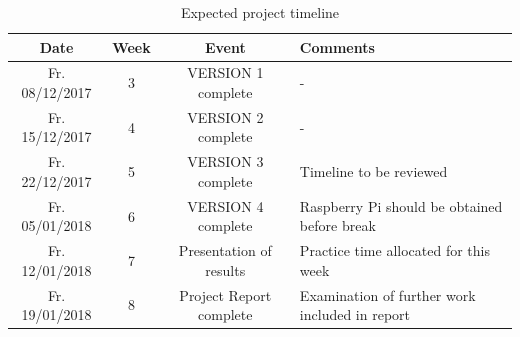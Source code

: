 \documentclass[11pt]{article}
\begin{document}
\begin{table}[!h] \label{timeline} \centering
 \begin{tabular}{|c c c p{5.5cm}|} 
 \hline
 Date & Week & Event & Comments \\ [0.5ex] 
 \hline
 Fr. 08/12/2017 & 3 & VERSION 1 complete & - \\
 Fr. 15/12/2017 & 4 & VERSION 2 complete & - \\
 Fr. 22/12/2017 & 5 & VERSION 3 complete & Timeline to be reviewed \\
 Fr. 05/01/2018 & 6 & VERSION 4 complete & Raspberry Pi should be obtained before break \\
 Fr. 12/01/2018 & 7 & Presentation of results & Practice time allocated for this week \\
 Fr. 19/01/2018 & 8 & Project Report complete & Examination of further work included in report \\
 \hline
\end{tabular}
\caption{Expected project timeline}
\end{table}
\end{document}
